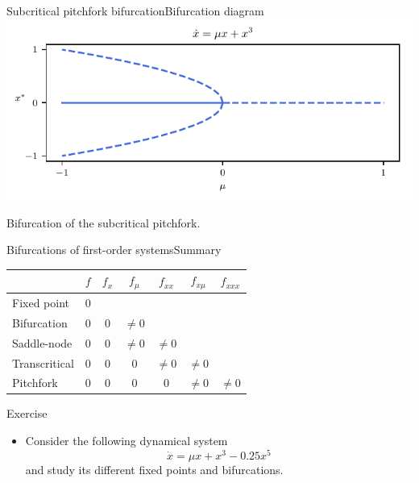 \documentclass[usenames,dvipsnames,svgnames,10pt,aspectratio=169]{beamer}
\begin{document}
\begin{frame}[t, c]{Subcritical pitchfork bifurcation}{Bifurcation diagram}
	\centering
	\includegraphics[width=.75\textwidth]{subcritical_pitchfork_bifurcation_diagram}

	Bifurcation of the subcritical pitchfork.

	\vspace{1cm}

\end{frame}

%

\begin{frame}[t, c]{Bifurcations of first-order systems}{Summary}
	\centering
	\begin{tabular}{l|cccccc}
		~ & $f$ & $f_x$ & $f_{\mu}$ & $f_{xx}$ & $f_{x \mu}$ & $f_{xxx}$ \\
		\hline
		Fixed point & $0$ \\
		Bifurcation  & $0$ & $0$ & $\neq 0$ \\
		Saddle-node & $0$ & $0$ & $\neq 0$ & $\neq 0$\\
		Transcritical & $0$ & $0$ & $0$ & $\neq 0$ & $\neq 0$\\
		Pitchfork & $0$ & $0$ & $0$ & $0$ & $\neq 0$ & $\neq 0$\\
	\end{tabular}

	\vspace{1cm}
\end{frame}

\begin{frame}[t, c]{Exercise}
	\begin{itemize}
		\item Consider the following dynamical system
		$$\dot{x} = \mu x + x^3 - 0.25 x^5$$
		and study its different fixed points and bifurcations.
	\end{itemize}

	\vspace{1cm}
\end{frame}
\end{document}
